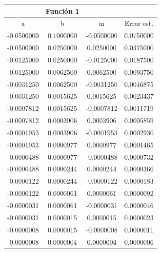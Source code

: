 \documentclass[12pt,a4paper]{article}
\begin{document}
\begin{tabular}{| c | c | c | c |}
\hline
 & Función 1 & &  \\
\hline
 a          &     b           &    m            &   Error est.  \\ \hline
-0.0500000   &    0.1000000   &   -0.0500000    &   0.0750000   \\   
-0.0500000   &   0.0250000    &   0.0250000     &  0.0375000   \\   
-0.0125000   &    0.0250000   &   -0.0125000    &   0.0187500   \\   
-0.0125000   &    0.0062500   &    0.0062500    &   0.0093750   \\   
-0.0031250   &    0.0062500   &   -0.0031250    &   0.0046875   \\   
-0.0031250   &    0.0015625   &    0.0015625    &   0.0023437   \\   
-0.0007812   &    0.0015625   &   -0.0007812    &   0.0011719   \\   
-0.0007812   &    0.0003906   &    0.0003906    &   0.0005859   \\   
-0.0001953   &    0.0003906   &   -0.0001953    &   0.0002930   \\   
-0.0001953   &    0.0000977   &    0.0000977    &   0.0001465   \\   
-0.0000488   &    0.0000977   &   -0.0000488    &   0.0000732   \\   
-0.0000488   &    0.0000244   &    0.0000244    &   0.0000366   \\   
-0.0000122   &    0.0000244   &   -0.0000122    &   0.0000183   \\   
-0.0000122   &    0.0000061   &    0.0000061    &   0.0000092   \\   
-0.0000031   &    0.0000061   &   -0.0000031    &   0.0000046   \\   
-0.0000031   &    0.0000015   &    0.0000015    &   0.0000023   \\   
-0.0000008   &    0.0000015   &   -0.0000008    &   0.0000011   \\   
-0.0000008   &    0.0000004   &    0.0000004    &   0.0000006   \\ \hline
                          
 \end{tabular}
 
\end{document}

